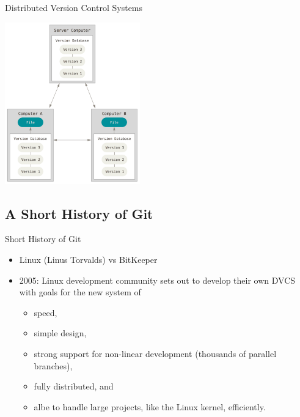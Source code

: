 \begin{frame}[t]{Distributed Version Control Systems}
  \begin{center}
    \includegraphics[height=2.75in]{../images/02-getting-started/distributed}
  \end{center}
\end{frame}

\subsection{A Short History of Git}
\begin{frame}[t]{Short History of Git}
  \begin{itemize}
    \item Linux (Linus Torvalds) vs BitKeeper
    \item 2005: Linux development community sets out to develop their own DVCS
      with goals for the new system of
      \begin{itemize}
        \item speed,
        \item simple design,
        \item strong support for non-linear development (thousands of parallel
          branches),
        \item fully distributed, and
        \item albe to handle large projects, like the Linux kernel,
          efficiently.
      \end{itemize}
  \end{itemize}
\end{frame}

